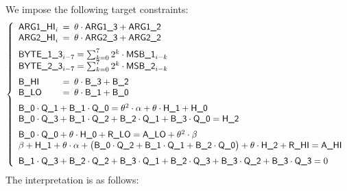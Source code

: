 We impose the following target constraints:
\[
\left\{ \begin{array}{lcl}
	\argOneHi_{i} & \!\!\! = \!\!\! & \theta \cdot \col{ARG1\_3} + \col{ARG1\_2} \\
	\argTwoHi_{i} & \!\!\! = \!\!\! & \theta \cdot \col{ARG2\_3} + \col{ARG2\_2} \vspace{2mm} \\
	\multicolumn{3}{l}{\byteCol{1\_3}_{i - 7} = \sum_{k = 0}^7 2^{k} \cdot \msb{1}_{i - k}} \\
	\multicolumn{3}{l}{\byteCol{2\_3}_{i - 7} = \sum_{k = 0}^7 2^{k} \cdot \msb{2}_{i - k}} \vspace{2mm} \\
	\col{B\_HI} & \!\!\! = \!\!\! & \theta \cdot \col{B\_3} + \col{B\_2} \\
	\col{B\_LO} & \!\!\! = \!\!\! & \theta \cdot \col{B\_1} + \col{B\_0} \vspace{2mm} \\
	\multicolumn{3}{l}{%
	\col{B\_0} \cdot \col{Q\_1} + \col{B\_1} \cdot \col{Q\_0} = \theta^2 \cdot \alpha + \theta \cdot \col{H\_1} + \col{H\_0}} \\
	\multicolumn{3}{l}{%
	\col{B\_0} \cdot \col{Q\_3} + \col{B\_1} \cdot \col{Q\_2} + \col{B\_2} \cdot \col{Q\_1} + \col{B\_3} \cdot \col{Q\_0} = \col{H\_2}} \vspace{2mm} \\
	\multicolumn{3}{l}{ \col{B\_0} \cdot \col{Q\_0} + \theta \cdot \col{H\_0} + \col{R\_LO} = \col{A\_LO} + \theta^2 \cdot \beta} \\
	\multicolumn{3}{l}{%
	\beta + \col{H\_1} + \theta \cdot \alpha
	+ \big(\col{B\_0} \cdot \col{Q\_2} + \col{B\_1} \cdot \col{Q\_1} + \col{B\_2} \cdot \col{Q\_0}\big)
	+ \theta \cdot \col{H\_2} + \col{R\_HI}
	=
	\col{A\_HI}} \vspace{2mm} \\
	\multicolumn{3}{l}{%
	\col{B\_1} \cdot \col{Q\_3} + \col{B\_2} \cdot \col{Q\_2} + \col{B\_3} \cdot \col{Q\_1}
	+ \col{B\_2} \cdot \col{Q\_3} + \col{B\_3} \cdot \col{Q\_2}
	+ \col{B\_3} \cdot \col{Q\_3} = 0} \\
\end{array} \right.
\]
The interpretation is as follows:
